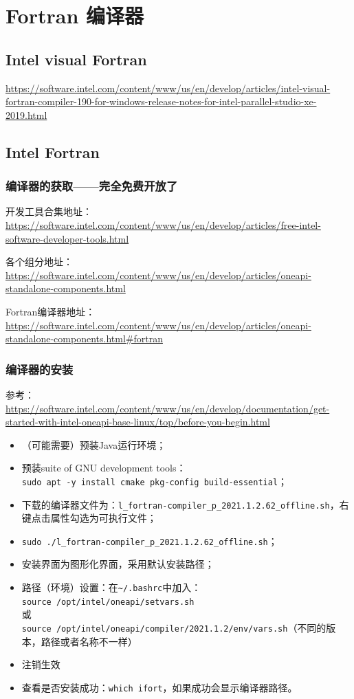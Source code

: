\newpage
\section{Fortran 编译器}
\subsection{Intel visual Fortran}
\url{https://software.intel.com/content/www/us/en/develop/articles/intel-visual-fortran-compiler-190-for-windows-release-notes-for-intel-parallel-studio-xe-2019.html}

\subsection{Intel Fortran}
\subsubsection{编译器的获取——完全免费开放了}
开发工具合集地址：\url{https://software.intel.com/content/www/us/en/develop/articles/free-intel-software-developer-tools.html}

各个组分地址：\url{https://software.intel.com/content/www/us/en/develop/articles/oneapi-standalone-components.html}

Fortran编译器地址：\url{https://software.intel.com/content/www/us/en/develop/articles/oneapi-standalone-components.html#fortran}


\subsubsection{编译器的安装}
参考：\url{https://software.intel.com/content/www/us/en/develop/documentation/get-started-with-intel-oneapi-base-linux/top/before-you-begin.html}

\begin{itemize}
\item （可能需要）预装Java运行环境；
\item  预装suite of GNU development tools：\\
\verb*|sudo apt -y install cmake pkg-config build-essential|；
\item 下载的编译器文件为：\verb|l_fortran-compiler_p_2021.1.2.62_offline.sh|，右键点击属性勾选为可执行文件；
\item \verb|sudo ./l_fortran-compiler_p_2021.1.2.62_offline.sh|；
\item 安装界面为图形化界面，采用默认安装路径；
\item 路径（环境）设置：在\verb*|~/.bashrc|中加入：\\
\verb|source /opt/intel/oneapi/setvars.sh|\\
或\\
\verb|source /opt/intel/oneapi/compiler/2021.1.2/env/vars.sh|（不同的版本，路径或者名称不一样）
\item 注销生效
\item 查看是否安装成功：\verb|which ifort|，如果成功会显示编译器路径。
\end{itemize}


